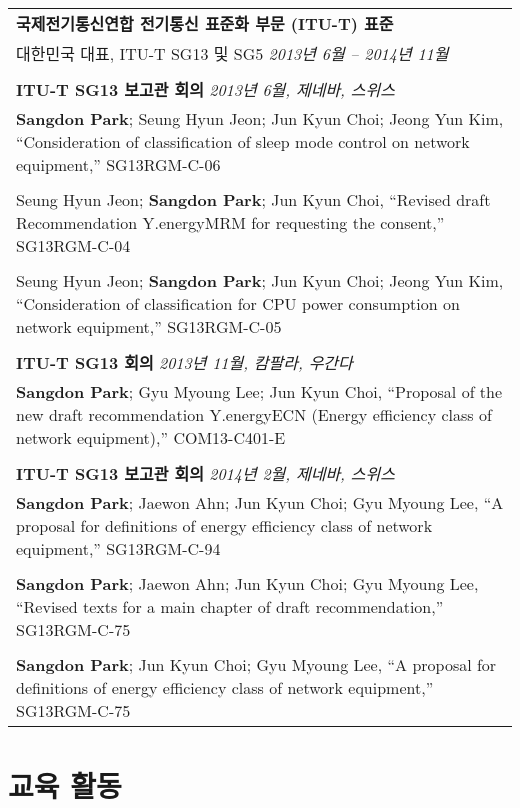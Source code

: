 \documentclass[11pt,a4paper]{article}
\begin{document}
\begin{tabularx}{\textwidth}{X}
\textbf{국제전기통신연합 전기통신 표준화 부문 (ITU-T) 표준} \\[0.2cm]
대한민국 대표, ITU-T SG13 및 SG5 \hfill \textit{2013년 6월 -- 2014년 11월}\\
\\[0.3cm]
\textbf{ITU-T SG13 보고관 회의} \hfill \textit{2013년 6월, 제네바, 스위스}
\\[0.2cm]
\textbf{Sangdon Park}; Seung Hyun Jeon; Jun Kyun Choi; Jeong Yun Kim, ``Consideration of classification of sleep mode control on network equipment,'' SG13RGM-C-06 \\[-0.2cm]
\\
Seung Hyun Jeon; \textbf{Sangdon Park}; Jun Kyun Choi, ``Revised draft Recommendation Y.energyMRM for requesting the consent,'' SG13RGM-C-04 \\[-0.2cm]
\\
Seung Hyun Jeon; \textbf{Sangdon Park}; Jun Kyun Choi; Jeong Yun Kim, ``Consideration of classification for CPU power consumption on network equipment,'' SG13RGM-C-05 \\
\\[0.3cm]
\textbf{ITU-T SG13 회의} \hfill \textit{2013년 11월, 캄팔라, 우간다} \\[0.2cm]
\textbf{Sangdon Park}; Gyu Myoung Lee; Jun Kyun Choi, ``Proposal of the new draft recommendation Y.energyECN (Energy efficiency class of network equipment),'' COM13-C401-E \\
\\[0.3cm]
\textbf{ITU-T SG13 보고관 회의} \hfill \textit{2014년 2월, 제네바, 스위스} \\[0.2cm]
\textbf{Sangdon Park}; Jaewon Ahn; Jun Kyun Choi; Gyu Myoung Lee, ``A proposal for definitions of energy efficiency class of network equipment,'' SG13RGM-C-94 \\[-0.2cm]
\\
\textbf{Sangdon Park}; Jaewon Ahn; Jun Kyun Choi; Gyu Myoung Lee, ``Revised texts for a main chapter of draft recommendation,'' SG13RGM-C-75 \\[-0.2cm]
\\
\textbf{Sangdon Park}; Jun Kyun Choi; Gyu Myoung Lee, ``A proposal for definitions of energy efficiency class of network equipment,'' SG13RGM-C-75 \\
\end{tabularx}

\section{교육 활동}
\end{document}
